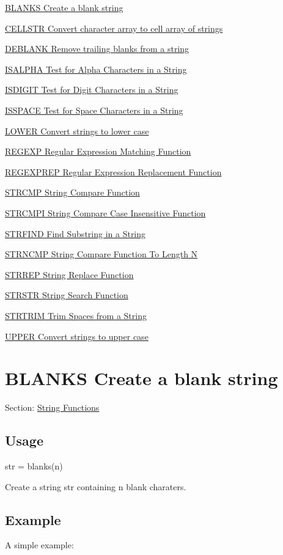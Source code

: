 
\begin{DoxyItemize}
\item \hyperlink{string_blanks}{B\-L\-A\-N\-K\-S Create a blank string}  
\item \hyperlink{string_cellstr}{C\-E\-L\-L\-S\-T\-R Convert character array to cell array of strings}  
\item \hyperlink{string_deblank}{D\-E\-B\-L\-A\-N\-K Remove trailing blanks from a string}  
\item \hyperlink{string_isalpha}{I\-S\-A\-L\-P\-H\-A Test for Alpha Characters in a String}  
\item \hyperlink{string_isdigit}{I\-S\-D\-I\-G\-I\-T Test for Digit Characters in a String}  
\item \hyperlink{string_isspace}{I\-S\-S\-P\-A\-C\-E Test for Space Characters in a String}  
\item \hyperlink{string_lower}{L\-O\-W\-E\-R Convert strings to lower case}  
\item \hyperlink{string_regexp}{R\-E\-G\-E\-X\-P Regular Expression Matching Function}  
\item \hyperlink{string_regexprep}{R\-E\-G\-E\-X\-P\-R\-E\-P Regular Expression Replacement Function}  
\item \hyperlink{string_strcmp}{S\-T\-R\-C\-M\-P String Compare Function}  
\item \hyperlink{string_strcmpi}{S\-T\-R\-C\-M\-P\-I String Compare Case Insensitive Function}  
\item \hyperlink{string_strfind}{S\-T\-R\-F\-I\-N\-D Find Substring in a String}  
\item \hyperlink{string_strncmp}{S\-T\-R\-N\-C\-M\-P String Compare Function To Length N }  
\item \hyperlink{string_strrep}{S\-T\-R\-R\-E\-P String Replace Function}  
\item \hyperlink{string_strstr}{S\-T\-R\-S\-T\-R String Search Function}  
\item \hyperlink{string_strtrim}{S\-T\-R\-T\-R\-I\-M Trim Spaces from a String}  
\item \hyperlink{string_upper}{U\-P\-P\-E\-R Convert strings to upper case}  
\end{DoxyItemize}\hypertarget{string_blanks}{}\section{B\-L\-A\-N\-K\-S Create a blank string}\label{string_blanks}
Section\-: \hyperlink{sec_string}{String Functions} \hypertarget{vtkwidgets_vtkxyplotwidget_Usage}{}\subsection{Usage}\label{vtkwidgets_vtkxyplotwidget_Usage}
\begin{DoxyVerb}    str = blanks(n)
\end{DoxyVerb}
 Create a string {\ttfamily str} containing {\ttfamily n} blank charaters. \hypertarget{variables_struct_Example}{}\subsection{Example}\label{variables_struct_Example}
A simple example\-:


